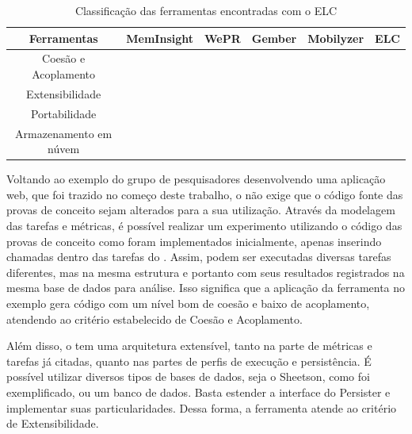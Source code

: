 \documentclass[12pt]{tcc}
\newcommand{\cmark}{\ding{51}}
\newcommand{\xmark}{\ding{55}}
\begin{document}
	\begin{table}[ht]
	\caption{Classificação das ferramentas encontradas com o ELC} %
	\centering %
	\begin{tabular}{c c c c c c} %
	\toprule %

	\textbf{Ferramentas} &\textbf{MemInsight} & \textbf{WePR} & \textbf{Gember} & \textbf{Mobilyzer} & \textbf{ELC}  \\ [0.4ex]

	\midrule %
	Coesão e Acoplamento & \cmark & \cmark & \cmark & \cmark  & \cmark  \\ 
	Extensibilidade & \xmark & \xmark & \xmark & \xmark  & \cmark \\
	Portabilidade & \cmark & \xmark & \xmark & \xmark  & \cmark \\
	Armazenamento em núvem & \xmark & \cmark & \cmark & \cmark & \cmark  \\
	\bottomrule %
	\end{tabular}
	\label{table:classificacao-com-elc} %
	\end{table}

	Voltando ao exemplo do grupo de pesquisadores desenvolvendo uma aplicação web, que foi trazido no começo deste trabalho, o  não exige que o código fonte das provas de conceito sejam alterados para a sua utilização. Através da modelagem das tarefas e métricas, é possível realizar um experimento utilizando o código das provas de conceito como foram implementados inicialmente, apenas inserindo chamadas dentro das tarefas do . Assim, podem ser executadas diversas tarefas diferentes, mas na mesma estrutura e portanto com seus resultados registrados na mesma base de dados para análise. Isso significa que a aplicação da ferramenta no exemplo gera código com um nível bom de coesão e baixo de acoplamento, atendendo ao critério estabelecido de Coesão e Acoplamento. 

	Além disso, o  tem uma arquitetura extensível, tanto na parte de métricas e tarefas já citadas, quanto nas partes de perfis de execução e persistência. É possível utilizar diversos tipos de bases de dados, seja o Sheetson, como foi exemplificado, ou um banco de dados. Basta estender a interface do Persister e implementar suas particularidades. Dessa forma, a ferramenta atende ao critério de Extensibilidade.
\end{document}
